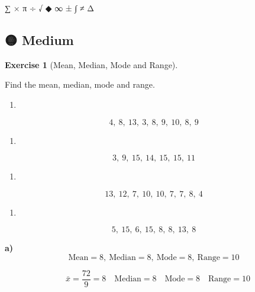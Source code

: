 \documentclass[
  letterpaper,
  DIV=11,
  numbers=noendperiod]{scrreprt}
\providecommand{\tightlist}{%
  \setlength{\itemsep}{0pt}\setlength{\parskip}{0pt}}
\theoremstyle{definition}
\newtheorem{exercise}{Exercise}[chapter]
\theoremstyle{remark}
\begin{document}
∑ × π ÷ √ ◆ ∞ ± ∫ ≠ Δ

\subsection{🟡 Medium}

\begin{exercise}[Mean, Median, Mode and
Range]\protect\hypertarget{exr-avg-5}{}\label{exr-avg-5}

Find the mean, median, mode and range.

\begin{enumerate}
\def\labelenumi{\alph{enumi})}
\tightlist
\item
\end{enumerate}

\[4,\ 8,\ 13,\ 3,\ 8,\ 9,\ 10,\ 8,\ 9\]

\begin{enumerate}
\def\labelenumi{\alph{enumi})}
\setcounter{enumi}{1}
\tightlist
\item
\end{enumerate}

\[3,\ 9,\ 15,\ 14,\ 15,\ 15,\ 11\]

\begin{enumerate}
\def\labelenumi{\alph{enumi})}
\setcounter{enumi}{2}
\tightlist
\item
\end{enumerate}

\[13,\ 12,\ 7,\ 10,\ 10,\ 7,\ 7,\ 8,\ 4\]

\begin{enumerate}
\def\labelenumi{\alph{enumi})}
\setcounter{enumi}{3}
\tightlist
\item
\end{enumerate}

\[5,\ 15,\ 6,\ 15,\ 8,\ 8,\ 13,\ 8\]

\begin{tcolorbox}[enhanced jigsaw, opacitybacktitle=0.6, coltitle=black, arc=.35mm, colframe=quarto-callout-tip-color-frame, colback=white, bottomrule=.15mm, left=2mm, colbacktitle=quarto-callout-tip-color!10!white, titlerule=0mm, opacityback=0, title=\textcolor{quarto-callout-tip-color}{\faLightbulb}\hspace{0.5em}{🔍 View Solution}, leftrule=.75mm, breakable, rightrule=.15mm, bottomtitle=1mm, toptitle=1mm, toprule=.15mm]

\textbf{a)}
\[\text{Mean}=8,\ \text{Median}=8,\ \text{Mode}=8,\ \text{Range}=10\]

\[\quad \bar{x}=\frac{72}{9}=8\quad \text{Median}=8\quad \text{Mode}=8\quad \text{Range}=10\]


\end{tcolorbox}
\end{exercise}
\end{document}
